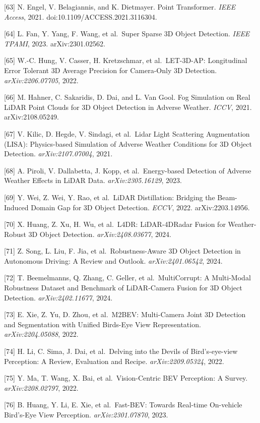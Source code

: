 {[}63{]} N. Engel, V. Belagiannis, and K. Dietmayer. Point Transformer. \emph{IEEE Access}, 2021. doi:10.1109/ACCESS.2021.3116304.

{[}64{]} L. Fan, Y. Yang, F. Wang, et al.~Super Sparse 3D Object Detection. \emph{IEEE TPAMI}, 2023. arXiv:2301.02562.

{[}65{]} W.-C. Hung, V. Casser, H. Kretzschmar, et al.~LET-3D-AP: Longitudinal Error Tolerant 3D Average Precision for Camera-Only 3D Detection. \emph{arXiv:2206.07705}, 2022.

{[}66{]} M. Hahner, C. Sakaridis, D. Dai, and L. Van Gool. Fog Simulation on Real LiDAR Point Clouds for 3D Object Detection in Adverse Weather. \emph{ICCV}, 2021. arXiv:2108.05249.

{[}67{]} V. Kilic, D. Hegde, V. Sindagi, et al.~Lidar Light Scattering Augmentation (LISA): Physics-based Simulation of Adverse Weather Conditions for 3D Object Detection. \emph{arXiv:2107.07004}, 2021.

{[}68{]} A. Piroli, V. Dallabetta, J. Kopp, et al.~Energy-based Detection of Adverse Weather Effects in LiDAR Data. \emph{arXiv:2305.16129}, 2023.

{[}69{]} Y. Wei, Z. Wei, Y. Rao, et al.~LiDAR Distillation: Bridging the Beam-Induced Domain Gap for 3D Object Detection. \emph{ECCV}, 2022. arXiv:2203.14956.

{[}70{]} X. Huang, Z. Xu, H. Wu, et al.~L4DR: LiDAR-4DRadar Fusion for Weather-Robust 3D Object Detection. \emph{arXiv:2408.03677}, 2024.

{[}71{]} Z. Song, L. Liu, F. Jia, et al.~Robustness-Aware 3D Object Detection in Autonomous Driving: A Review and Outlook. \emph{arXiv:2401.06542}, 2024.

{[}72{]} T. Beemelmanns, Q. Zhang, C. Geller, et al.~MultiCorrupt: A Multi-Modal Robustness Dataset and Benchmark of LiDAR-Camera Fusion for 3D Object Detection. \emph{arXiv:2402.11677}, 2024.

{[}73{]} E. Xie, Z. Yu, D. Zhou, et al.~M2BEV: Multi-Camera Joint 3D Detection and Segmentation with Unified Birds-Eye View Representation. \emph{arXiv:2204.05088}, 2022.

{[}74{]} H. Li, C. Sima, J. Dai, et al.~Delving into the Devils of Bird's-eye-view Perception: A Review, Evaluation and Recipe. \emph{arXiv:2209.05324}, 2022.

{[}75{]} Y. Ma, T. Wang, X. Bai, et al.~Vision-Centric BEV Perception: A Survey. \emph{arXiv:2208.02797}, 2022.

{[}76{]} B. Huang, Y. Li, E. Xie, et al.~Fast-BEV: Towards Real-time On-vehicle Bird's-Eye View Perception. \emph{arXiv:2301.07870}, 2023.

